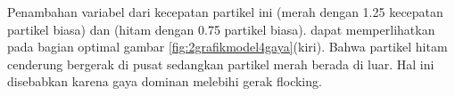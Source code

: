 Penambahan variabel dari kecepatan partikel ini (merah dengan 1.25 kecepatan partikel biasa) dan (hitam dengan 0.75 partikel biasa). dapat memperlihatkan pada bagian optimal gambar  \ref{fig:2grafikmodel4gaya}(kiri). Bahwa partikel hitam cenderung bergerak di pusat sedangkan partikel merah berada di luar. Hal ini disebabkan karena gaya dominan melebihi gerak flocking.

